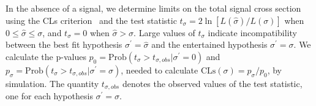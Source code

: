 In the absence of  a signal, we determine limits on the total signal cross section using the CLs
criterion~\cite{LHCCLs} and the test statistic $t_\sigma = 2 \ln [ L(\hat{\sigma}) /  L(\sigma)]$
when $0 \leq\hat{\sigma} \leq \sigma$, and $t_\sigma = 0$ when $\hat{\sigma} > \sigma$. 
Large values of $t_\sigma$ indicate incompatibility between the best fit hypothesis $\sigma^\prime 
= \hat{\sigma}$ and the entertained hypothesis $\sigma^\prime  = \sigma$. 
We calculate  the p-values $p_0 = \textrm{Prob}(t_\sigma > t_{\sigma, obs} | \sigma^\prime = 0)$ 
and $p_\sigma = \textrm{Prob}(t_\sigma > t_{\sigma, obs} | \sigma^\prime=\sigma)$, needed to
calculate $\textrm{CLs}(\sigma) = p_\sigma / p_0$,  by simulation. 
The quantity $t_{\sigma, obs}$ denotes the observed values of the test statistic, one for each
hypothesis $\sigma^\prime=\sigma$.





